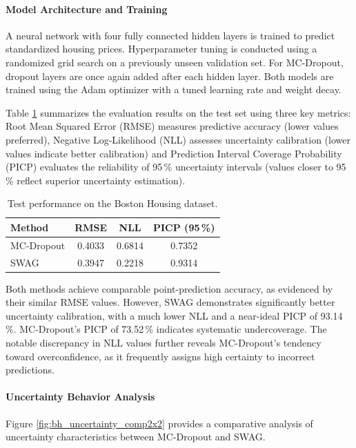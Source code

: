 \paragraph{Model Architecture and Training}
A neural network with four fully connected hidden layers is trained to predict standardized housing
prices. Hyperparameter tuning is conducted using a randomized grid search on a previously unseen
validation set. For MC-Dropout, dropout layers are once again added after each hidden layer.
Both models are trained using the Adam optimizer with a tuned learning rate and weight decay.

Table \ref{tab:bh_metrics} summarizes the evaluation results on the test set using three key metrics:
Root Mean Squared Error (RMSE) measures predictive accuracy (lower values preferred), Negative
Log-Likelihood (NLL) assesses uncertainty calibration (lower values indicate better calibration) and
Prediction Interval Coverage Probability (PICP) evaluates the reliability of 95\,\% uncertainty
intervals (values closer to 95\,\% reflect superior uncertainty estimation).

\begin{table}[h!]
\centering
\begin{tabular}{lccc}
\toprule
Method & RMSE & NLL & PICP (95\,\%) \\
\midrule
MC-Dropout & 0.4033 & 0.6814 & 0.7352 \\
SWAG       & 0.3947 & 0.2218 & 0.9314 \\
\bottomrule
\end{tabular}
\caption{Test performance on the Boston Housing dataset.}
\label{tab:bh_metrics}
\end{table}

Both methods achieve comparable point-prediction accuracy, as evidenced by their similar RMSE values.
However, SWAG demonstrates significantly better uncertainty calibration, with a much lower NLL and a
near-ideal PICP of 93.14\,\%. MC-Dropout's PICP of 73.52\,\% indicates systematic undercoverage.
The notable discrepancy in NLL values further reveals MC-Dropout's tendency toward overconfidence,
as it frequently assigns high certainty to incorrect predictions.


\paragraph{Uncertainty Behavior Analysis}
Figure \ref{fig:bh_uncertainty_comp2x2} provides a comparative analysis of uncertainty characteristics between MC-Dropout and SWAG.


